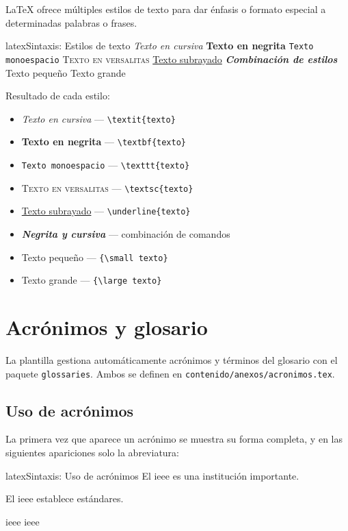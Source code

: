 \LaTeX{} ofrece múltiples estilos de texto para dar énfasis o formato
especial a determinadas palabras o frases.

\begin{codigosimple}{latex}{Sintaxis: Estilos de texto}
\textit{Texto en cursiva}
\textbf{Texto en negrita}
\texttt{Texto monoespacio}
\textsc{Texto en versalitas}
\underline{Texto subrayado}
\textbf{\textit{Combinación de estilos}}
{\small Texto pequeño}
{\large Texto grande}
\end{codigosimple}

Resultado de cada estilo:

\begin{itemize}
  \item \textit{Texto en cursiva} --- \verb|\textit{texto}|
  \item \textbf{Texto en negrita} --- \verb|\textbf{texto}|
  \item \texttt{Texto monoespacio} --- \verb|\texttt{texto}|
  \item \textsc{Texto en versalitas} --- \verb|\textsc{texto}|
  \item \underline{Texto subrayado} --- \verb|\underline{texto}|
  \item \textbf{\textit{Negrita y cursiva}} --- combinación de comandos
  \item {\small Texto pequeño} --- \verb|{\small texto}|
  \item {\large Texto grande} --- \verb|{\large texto}|
\end{itemize}

\section{Acrónimos y glosario}
\label{sec:acronimos}

La plantilla gestiona automáticamente acrónimos y términos del glosario con el
paquete \texttt{glossaries}. Ambos se definen en \texttt{contenido/anexos/acronimos.tex}.

\subsection{Uso de acrónimos}
\label{subsec:uso-acronimos}

La primera vez que aparece un acrónimo se muestra su forma completa, y en
las siguientes apariciones solo la abreviatura:

\begin{codigosimple}{latex}{Sintaxis: Uso de acrónimos}
El \gls{ieee} es una institución importante.

El \gls{ieee} establece estándares.

\acrlong{ieee}   %
\acrshort{ieee}  %
\end{codigosimple}

